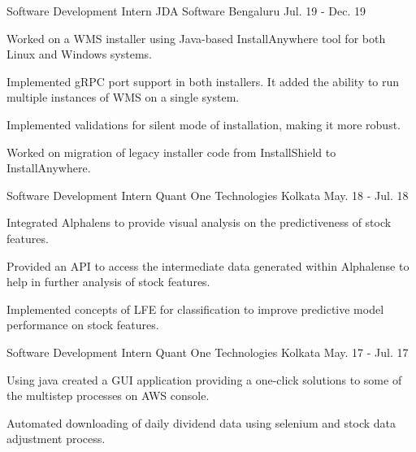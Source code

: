 

\begin{cventries}

  \cventry
    {Software Development Intern} %
    {JDA Software} %
    {Bengaluru} %
    {Jul. 19 - Dec. 19} %
    {
      \begin{cvitems}
        \item{Worked on a WMS installer using Java-based InstallAnywhere tool for both Linux
         and Windows systems.}
        \item{Implemented gRPC port support in both installers.
         It added the ability to run multiple instances of WMS on a single system.}
        \item{Implemented validations for silent mode of installation, making it more robust.}
        \item{Worked on migration of legacy installer code from InstallShield to InstallAnywhere.}
      \end{cvitems}
    }

  \cventry
    {Software Development Intern} %
    {Quant One Technologies} %
    {Kolkata} %
    {May. 18 - Jul. 18} %
    {
      \begin{cvitems}
        \item {Integrated Alphalens to provide visual analysis on the predictiveness
         of stock features.}
        \item {Provided an API to access the intermediate data generated within Alphalense
         to help in further analysis of stock features.}
        \item {Implemented concepts of LFE for classification to improve predictive
         model performance on stock features.}
      \end{cvitems}
    }

  \cventry
    {Software Development Intern} %
    {Quant One Technologies} %
    {Kolkata} %
    {May. 17 - Jul. 17} %
    {
      \begin{cvitems}
        \item {Using java created a GUI application providing a
         one-click solutions to some of the multistep processes on AWS console.}
        \item {Automated downloading of daily dividend data using selenium
         and stock data adjustment process.}
      \end{cvitems}
    }

\end{cventries}
